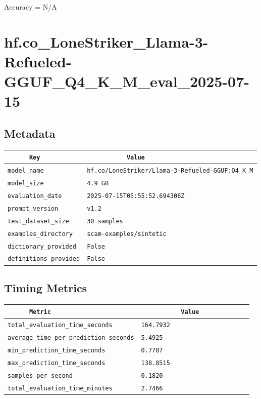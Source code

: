 \documentclass{article}
\begin{document}
\begin{center}
Accuracy = N/A
\end{center}

\section{hf.co\_LoneStriker\_Llama-3-Refueled-GGUF\_Q4\_K\_M\_eval\_2025-07-15}
\subsection{Metadata}

\begin{center}
\begin{tabular}{l | l} \hline
    \verb|      Key      | & \verb|           Value           | \\ \hline
    \hline
    \verb|model_name    | & \verb|hf.co/LoneStriker/Llama-3-Refueled-GGUF:Q4_K_M| \\ \hline
    \verb|model_size    | & \verb|4.9 GB                       | \\ \hline
    \verb|evaluation_date| & \verb|2025-07-15T05:55:52.694308Z  | \\ \hline
    \verb|prompt_version| & \verb|v1.2                         | \\ \hline
    \verb|test_dataset_size| & \verb|30 samples                   | \\ \hline
    \verb|examples_directory| & \verb|scam-examples/sintetic       | \\ \hline
    \verb|dictionary_provided| & \verb|False                        | \\ \hline
    \verb|definitions_provided| & \verb|False                        | \\ \hline
\end{tabular}
\end{center}

\subsection{Timing Metrics}

\begin{center}
\begin{tabular}{l | l} \hline
    \verb|      Metric     | & \verb|           Value           | \\ \hline
    \hline
    \verb|total_evaluation_time_seconds| & \verb|164.7932                     | \\ \hline
    \verb|average_time_per_prediction_seconds| & \verb|5.4925                       | \\ \hline
    \verb|min_prediction_time_seconds| & \verb|0.7787                       | \\ \hline
    \verb|max_prediction_time_seconds| & \verb|138.8515                     | \\ \hline
    \verb|samples_per_second| & \verb|0.1820                       | \\ \hline
    \verb|total_evaluation_time_minutes| & \verb|2.7466                       | \\ \hline
\end{tabular}
\end{center}
\end{document}

